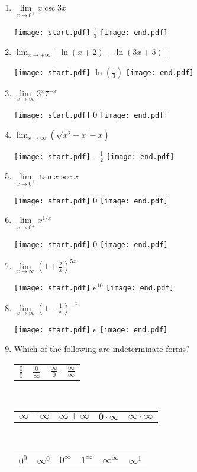 \documentclass[12pt]{article}
\begin{document}
\begin{enumerate}
\item $\lim\limits_{x\rightarrow 0^+} x \csc{3x}$

\texttt{[image: start.pdf]}
{{$\frac{1}{3}$}}
\texttt{[image: end.pdf]}
  

\item $\lim_{x \rightarrow+\infty}\left[\ln{(x+2)}-\ln{(3x+5)}\right]$

\texttt{[image: start.pdf]}
{{$\ln{\left(\frac{1}{3}\right)}$}}
\texttt{[image: end.pdf]}


\item $\lim\limits_{x\rightarrow \infty} 3^{x}7^{-x}$ 

\texttt{[image: start.pdf]}
{{0}}
\texttt{[image: end.pdf]}


\item  $\displaystyle \lim_{x\rightarrow \infty}{\left(\sqrt{x^2-x}-x\right)}$

\texttt{[image: start.pdf]}
{{$\displaystyle -\frac{1}{2}$}}
\texttt{[image: end.pdf]}


\item $\lim\limits_{x\rightarrow 0^+} \tan{x}\sec{x}$ 

\texttt{[image: start.pdf]}
{{0}}
\texttt{[image: end.pdf]}


\item $\lim\limits_{x\rightarrow 0^+} x^{1/x}$ 

\texttt{[image: start.pdf]}
{{0}}
\texttt{[image: end.pdf]}


\item $\lim\limits_{x\rightarrow \infty} \left(1+\frac{2}{x}\right)^{5x}$ 

\texttt{[image: start.pdf]}
{{$e^{10}$}}
\texttt{[image: end.pdf]}


\item $\lim\limits_{x\rightarrow \infty} \left(1-\frac{1}{x}\right)^{-x}$ 

\texttt{[image: start.pdf]}
{{$e$}}
\texttt{[image: end.pdf]}


\newpage

\item Which of the following are indeterminate forms?

\begin{center}
\begin{tabular}{cccc}
$\frac{0}{0}$ & $\frac{0}{\infty}$ & $\frac{\infty}{0}$& $\frac{\infty}{\infty}$
\end{tabular}\\
\medskip
\begin{tabular}{cccc}
$\infty-\infty$ & $\infty+\infty$ & $0 \cdot \infty$ & $\infty \cdot \infty$
\end{tabular}\\
\medskip
\begin{tabular}{cccccc}
$0^0$ & $\infty^0$ & $0^{\infty}$ & $1^\infty$ & $\infty^{\infty}$ & $\infty^{1}$
\end{tabular}
\end{center}


\end{enumerate}
\end{document}
